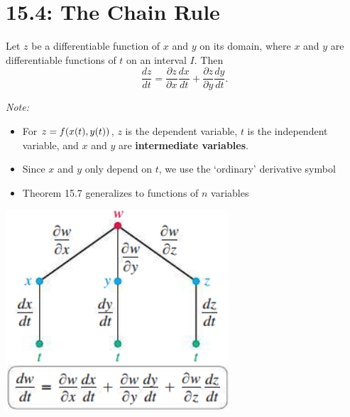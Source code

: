 \documentclass[mathNotesPreamble]{subfiles}
\begin{document}
\section{15.4: The Chain Rule}

  \begin{thmBox*}
    Let $z$ be a differentiable function of $x$ and $y$ on its domain, where $x$ and $y$ are differentiable functions of $t$ on an interval $I$. Then
      \[\frac{dz}{dt}=\frac{\partial z}{\partial x}\frac{dx}{dt}+\frac{\partial z}{\partial y}\frac{dy}{dt}.\]
  \end{thmBox*}
  \vspace*{\baselineskip}

  \noindent
  \begin{minipage}{0.65\linewidth}
  \textit{Note:} 
    \begin{itemize}
      \item For $z=f{\left(x(t), y(t)\right)}$, $z$ is the dependent variable, $t$ is the independent variable, and $x$ and $y$ are \newline\textbf{intermediate variables}.
      \item Since $x$ and $y$ only depend on $t$, we use the `ordinary' derivative symbol
      \item Theorem 15.7 generalizes to functions of $n$ variables
    \end{itemize}
  \end{minipage}%
  \begin{minipage}{0.35\linewidth}
    \begin{flushright}
      \includegraphics[width=0.9\linewidth]{images/briggs_15_04/fig15_37}
    \end{flushright}
  \end{minipage}
  \vspace*{\baselineskip}
\end{document}
